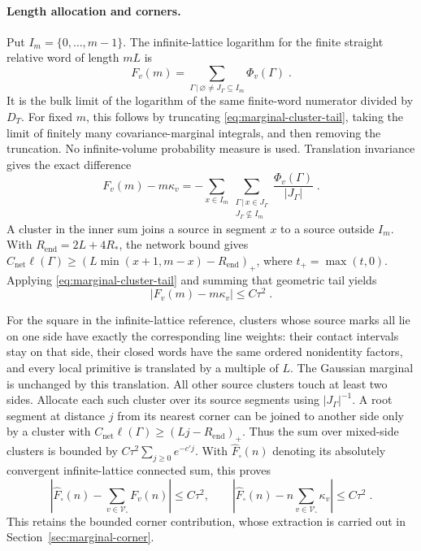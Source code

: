 \documentclass[11pt]{article}
\begin{document}
\paragraph{Length allocation and corners.}
Put $I_m=\{0,\ldots,m-1\}$. The infinite-lattice logarithm for the finite straight relative word of length $mL$ is
\begin{equation}\label{eq:marginal-finite-line-log}
    F_v(m)=\sum_{\Gamma\, | \,\varnothing\ne J_\Gamma\subseteq I_m}
        \Phi_v(\Gamma)\;.
\end{equation}
It is the bulk limit of the logarithm of the same finite-word numerator divided by $D_T$. For fixed $m$, this follows by truncating \eqref{eq:marginal-cluster-tail}, taking the limit of finitely many covariance-marginal integrals, and then removing the truncation. No infinite-volume probability measure is used. Translation invariance gives the exact difference
\begin{equation}\label{eq:marginal-line-endpoints}
    F_v(m)-m\kappa_v
        =-\sum_{x\in I_m}
            \sum_{\substack{\Gamma\, | \,x\in J_\Gamma\\
                                      J_\Gamma\not \subseteq I_m}}
                \frac{\Phi_v(\Gamma)}{|J_\Gamma|}\;.
\end{equation}
A cluster in the inner sum joins a source in segment $x$ to a source outside $I_m$. With $R_{\mathrm{end}}=2L+4R_*$, the network bound gives $C_{\mathrm{net}}\ell(\Gamma)\geq (L\min(x+1,m-x)-R_{\mathrm{end}})_+$, where $t_+=\max(t,0)$. Applying \eqref{eq:marginal-cluster-tail} and summing that geometric tail yields
\begin{equation}\label{eq:marginal-line-density-limit}
    |F_v(m)-m\kappa_v|\leq C\tau^2\;.
\end{equation}

For the square in the infinite-lattice reference, clusters whose source marks all lie on one side have exactly the corresponding line weights: their contact intervals stay on that side, their closed words have the same ordered nonidentity factors, and every local primitive is translated by a multiple of $L$. The Gaussian marginal is unchanged by this translation. All other source clusters touch at least two sides. Allocate each such cluster over its source segments using $|J_\Gamma|^{-1}$. A root segment at distance $j$ from its nearest corner can be joined to another side only by a cluster with $C_{\mathrm{net}}\ell(\Gamma)\geq (Lj-R_{\mathrm{end}})_+$. Thus the sum over mixed-side clusters is bounded by $C\tau^2\sum_{j\geq 0}e^{-c'j}$. With $\widehat F_\square(n)$ denoting its absolutely convergent infinite-lattice connected sum, this proves
\begin{equation}\label{eq:marginal-square-corners}
    \left|\widehat F_\square(n)
        -\sum_{v\in \mathscr V_\square}F_v(n)\right|
        \leq C\tau^2,
    \qquad
    \left|\widehat F_\square(n)
        -n\sum_{v\in \mathscr V_\square}\kappa_v\right|
        \leq C\tau^2\;.
\end{equation}
This retains the bounded corner contribution, whose extraction is carried out in Section~\ref{sec:marginal-corner}.
\end{document}
